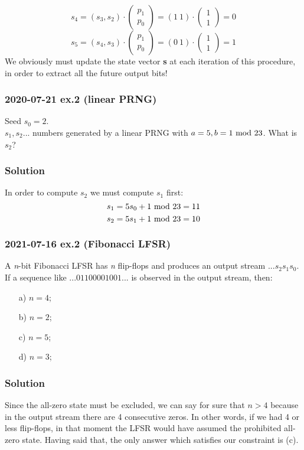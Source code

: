 $$
    s_4=(s_3, s_2)\cdot
    \begin{pmatrix}
        p_1\\
        p_0
    \end{pmatrix}=
    (1\ 1)\cdot
    \begin{pmatrix}
        1\\
        1
    \end{pmatrix}=0
$$
$$
    s_5=(s_4, s_3)\cdot
    \begin{pmatrix}
        p_1\\
        p_0
    \end{pmatrix}=
    (0\ 1)\cdot
    \begin{pmatrix}
        1\\
        1
    \end{pmatrix}=1
$$
We obviously must update the state vector \textbf{s} at each iteration of this procedure, in order to extract all the future output bits!
\newpage
\subsubsection{2020-07-21 ex.2 (linear PRNG)}
Seed $s_0=2$.\\
$s_1,s_2$... numbers generated  by a linear PRNG with $a=5, b=1\text{ mod } 23$. What is $s_2$?
\subsubsection*{Solution}
In order to compute $s_2$ we must compute $s_1$ first:
$$s_1=5s_0+1\text{ mod } 23=11$$
$$s_2=5s_1+1\text{ mod } 23=10$$

\subsubsection{2021-07-16 ex.2 (Fibonacci LFSR)}
A \textit{n}-bit Fibonacci LFSR has \textit{n} flip-flops and produces an output stream $...s_2s_1s_0$.\\
If a sequence like $...01100001001...$ is observed in the output stream, then:
\begin{enumerate}
    \item[a)] $n=4$;
    \item[b)] $n=2$;
    \item[c)] $n=5$;
    \item[d)] $n=3$;
\end{enumerate}

\subsubsection*{Solution}
Since the all-zero state must be excluded, we can say for sure that $n>4$ because in the output stream there are 4 consecutive zeros. In other words, if we had 4 or less flip-flops, in that moment the LFSR would have assumed the prohibited all-zero state. Having said that, the only answer which satisfies our constraint is \nolinebreak(c).

